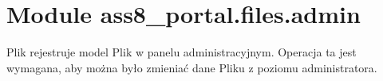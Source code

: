 %
%
%


\section{Module ass8\_portal.files.admin}

    \label{ass8_portal:files:admin}
Plik rejestruje model Plik w panelu administracyjnym. Operacja ta jest 
wymagana, aby można było zmieniać dane Pliku z poziomu administratora.

